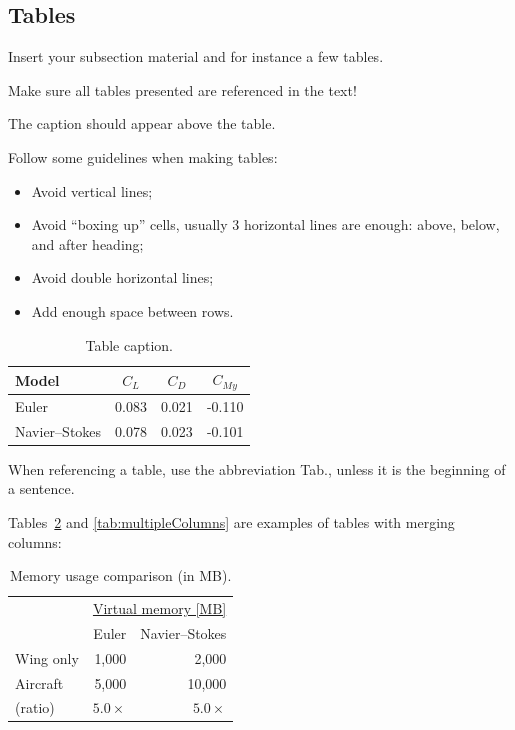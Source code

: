 \subsection{Tables}
\label{section:tables}

Insert your subsection material and for instance a few tables.

Make sure all tables presented are referenced in the text!

The caption should appear above the table.

Follow some guidelines when making tables:

\begin{itemize}
  \item Avoid vertical lines;
  \item Avoid “boxing up” cells, usually 3 horizontal lines are enough: above, below, and after heading;
  \item Avoid double horizontal lines;
  \item Add enough space between rows.
\end{itemize}

\begin{table}[!htb]
  \caption[Table caption shown in TOC.]{Table caption.}
  \label{tab:aeroCoeff}
  \renewcommand{\arraystretch}{1.2} %
  \centering
  \begin{tabular}{lccc}
    \toprule
    Model           & $C_L$ & $C_D$ & $C_{M y}$ \\
    \midrule
    Euler           & 0.083 & 0.021 & -0.110    \\
    Navier--Stokes  & 0.078 & 0.023 & -0.101    \\
    \bottomrule
  \end{tabular}
\end{table}

When referencing a table, use the abbreviation Tab., unless it is the beginning of a sentence.

Tables~\ref{tab:memory} and \ref{tab:multipleColumns} are examples of tables with merging columns:

\begin{table}[!htb]
  \caption{Memory usage comparison (in MB).}
  \label{tab:memory}
  \renewcommand{\arraystretch}{1.2} %
  \centering
  \begin{tabular}[]{lrr}
    \toprule
                & \multicolumn{2}{c}{\underline{Virtual memory [MB]}} \\
                & Euler       & Navier--Stokes \\
    \midrule
      Wing only &  1,000      &    2,000       \\
      Aircraft  &  5,000      &   10,000       \\
      (ratio)   & $5.0\times$ & $5.0\times$    \\
    \bottomrule
  \end{tabular}
\end{table}

